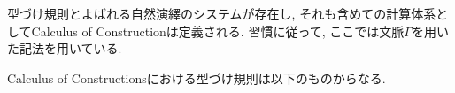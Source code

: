 \documentclass{ltjsarticle}
\begin{document}
型づけ規則とよばれる自然演繹のシステムが存在し, それも含めての計算体系としてCalculus of Constructionは定義される. 習慣に従って, ここでは文脈$\Gamma$を用いた記法を用いている.

\begin{defn}
 Calculus of Constructionsにおける型づけ規則は以下のものからなる.
\infrule[Ax]{
}{
 \vdash \star \colon \square
}
\end{defn}
\end{document}
